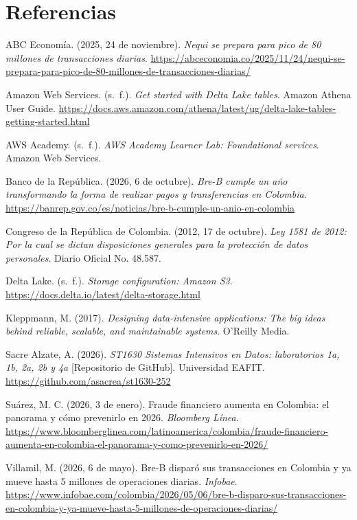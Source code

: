 \documentclass[12pt,letterpaper]{article}
\begin{document}
\section*{Referencias}
\begin{footnotesize}
\setlength{\parindent}{0pt}\setlength{\parskip}{3pt}

ABC Economía. (2025, 24 de noviembre). \emph{Nequi se prepara para pico de 80 millones de transacciones diarias}. \url{https://abceconomia.co/2025/11/24/nequi-se-prepara-para-pico-de-80-millones-de-transacciones-diarias/}

Amazon Web Services. (s.~f.). \emph{Get started with Delta Lake tables}. Amazon Athena User Guide. \url{https://docs.aws.amazon.com/athena/latest/ug/delta-lake-tables-getting-started.html}

AWS Academy. (s.~f.). \emph{AWS Academy Learner Lab: Foundational services}. Amazon Web Services.

Banco de la República. (2026, 6 de octubre). \emph{Bre-B cumple un año transformando la forma de realizar pagos y transferencias en Colombia}. \url{https://banrep.gov.co/es/noticias/bre-b-cumple-un-anio-en-colombia}

Congreso de la República de Colombia. (2012, 17 de octubre). \emph{Ley 1581 de 2012: Por la cual se dictan disposiciones generales para la protección de datos personales}. Diario Oficial No. 48.587.

Delta Lake. (s.~f.). \emph{Storage configuration: Amazon S3}. \url{https://docs.delta.io/latest/delta-storage.html}

Kleppmann, M. (2017). \emph{Designing data-intensive applications: The big ideas behind reliable, scalable, and maintainable systems}. O'Reilly Media.

Sacre Alzate, A. (2026). \emph{ST1630 Sistemas Intensivos en Datos: laboratorios 1a, 1b, 2a, 2b y 4a} [Repositorio de GitHub]. Universidad EAFIT. \url{https://github.com/asacrea/st1630-252}

Suárez, M. C. (2026, 3 de enero). Fraude financiero aumenta en Colombia: el panorama y cómo prevenirlo en 2026. \emph{Bloomberg Línea}. \url{https://www.bloomberglinea.com/latinoamerica/colombia/fraude-financiero-aumenta-en-colombia-el-panorama-y-como-prevenirlo-en-2026/}

Villamil, M. (2026, 6 de mayo). Bre-B disparó sus transacciones en Colombia y ya mueve hasta 5 millones de operaciones diarias. \emph{Infobae}. \url{https://www.infobae.com/colombia/2026/05/06/bre-b-disparo-sus-transacciones-en-colombia-y-ya-mueve-hasta-5-millones-de-operaciones-diarias/}\par
\end{footnotesize}
\end{document}
